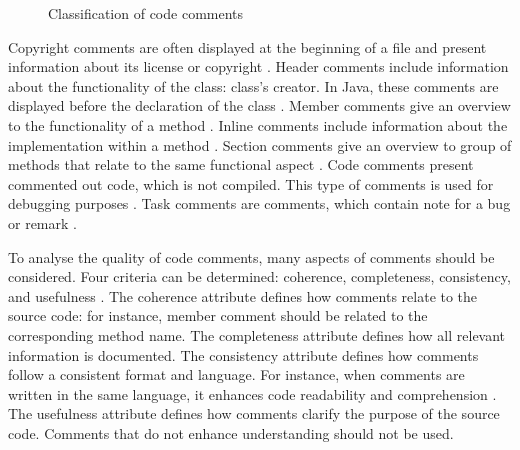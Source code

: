 \begin{figure}[H]
\centering
{}
\caption{Classification of code comments
\cite{hassan2022code}}
\label{fig:comment_classification}
\end{figure}





Copyright comments are often displayed at the beginning of a file and present information about its license or copyright \cite{steidl2013quality}. Header comments include information about the functionality of the class: class's creator. In Java, these comments are displayed before the declaration of the class \cite{hassan2022code}. Member comments give an overview to the functionality of a method \cite{steidl2013quality}. Inline comments include information about the implementation within a method \cite{steidl2013quality}. Section comments give an overview to group of methods that relate to the same functional aspect \cite{hassan2022code}. Code comments present commented out code, which is not compiled. This type of comments is used for debugging purposes \cite{steidl2013quality}. Task comments are comments, which contain note for a bug or remark \cite{steidl2013quality}.



To analyse the quality of code comments, many aspects of comments should be considered. Four criteria can be determined: coherence, completeness, consistency, and usefulness \cite{steidl2013quality}.
The coherence attribute defines how comments relate to the source code: for instance, member comment should be related to the corresponding method name.
The completeness attribute defines how all relevant information is documented. 
The consistency attribute defines how comments follow a consistent format and language. For instance, when comments are written in the same language, it enhances code readability and comprehension \cite{steidl2013quality}.
The usefulness attribute defines how comments clarify the purpose of the source code. Comments that do not enhance understanding should not be used. 


